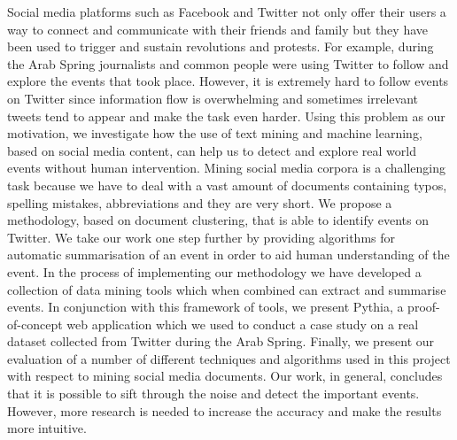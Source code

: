 


\begin{abstracts}        %

Social media platforms such as Facebook and Twitter not only offer their users a way to connect and communicate with their friends and
family but they have been used to trigger and sustain revolutions and protests. For example, during the Arab Spring 
journalists and common people were using Twitter to follow and explore the events that 
took place. However, it is extremely hard to follow events on Twitter since information flow is overwhelming and sometimes irrelevant tweets 
tend to appear and make the task even harder. Using this problem as our motivation, we investigate how the use of text mining and machine 
learning, based on social media content, can help us to detect and explore real world events without human intervention. 
Mining social media corpora is a challenging task because we have to deal with a vast amount of 
documents containing typos, spelling mistakes, abbreviations and they are very short. We propose a methodology, based on document 
clustering, that is able to identify events on Twitter. We take our work one step further by providing algorithms for automatic 
summarisation of an event in order to aid human understanding of the event. In the process of implementing our methodology we have developed a collection 
of data mining tools which when combined can extract and summarise events. In conjunction with this framework of tools, we 
present Pythia, a proof-of-concept web application which we used to conduct a case study on a real dataset collected from 
Twitter during the Arab Spring. Finally, we present our evaluation of a number of different techniques and algorithms 
used in this project with respect to mining social media documents. Our work, in general, concludes that it is possible to
sift through the noise and detect the important events. However, more research is needed to increase the accuracy and 
make the results more intuitive.   


\end{abstracts}




